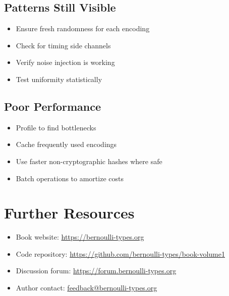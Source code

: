 \subsection{Patterns Still Visible}
\begin{itemize}
\item Ensure fresh randomness for each encoding
\item Check for timing side channels
\item Verify noise injection is working
\item Test uniformity statistically
\end{itemize}

\subsection{Poor Performance}
\begin{itemize}
\item Profile to find bottlenecks
\item Cache frequently used encodings
\item Use faster non-cryptographic hashes where safe
\item Batch operations to amortize costs
\end{itemize}

\section{Further Resources}

\begin{itemize}
\item Book website: \url{https://bernoulli-types.org}
\item Code repository: \url{https://github.com/bernoulli-types/book-volume1}
\item Discussion forum: \url{https://forum.bernoulli-types.org}
\item Author contact: \url{feedback@bernoulli-types.org}
\end{itemize}